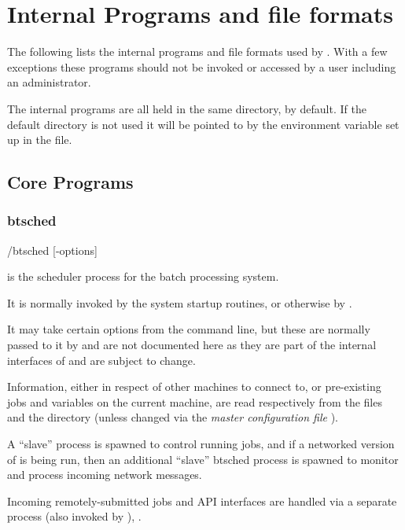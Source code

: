 \chapter{Internal Programs and file formats}
\label{chp:internal-programs-and-file-formats}
The following lists the internal programs and file formats used by \ProductName{}. With a few exceptions these programs should not be invoked or
accessed by a user including an administrator.

The internal programs are all held in the same directory, \progsdir{} by default. If the default directory is not used it will be pointed to by the
 environment variable set up in the \masterconfig{} file.

\section{Core Programs}
\subsection{btsched}

\begin{expara}

\progsdirname/btsched [-options]

\end{expara}

 is the scheduler process for the \ProductName{} batch processing system.

It is normally invoked by the system startup routines, or otherwise by \PrBtstart{}.

It may take certain options from the command line, but these are normally passed to it by \PrBtstart{} and are not
documented here as they are part of the internal interfaces of \ProductName{} and are subject to change.

Information, either in respect of other machines to connect to, or pre-existing jobs and variables on the current machine, are read
respectively from the files \hostsfile{} and the directory \spooldir{} (unless changed via the \textit{master configuration file} \masterconfig).

A ``slave''  process is spawned to control running jobs, and if a networked version of \ProductName{} is being run,
then an additional ``slave'' btsched process is spawned to monitor and process incoming network messages.

Incoming remotely-submitted jobs and API interfaces are handled via a separate process (also invoked by \PrBtstart{}), .

